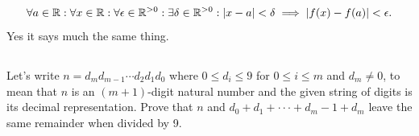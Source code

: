 \documentclass[12pt]{article}
\begin{document}
\subsection{}
\begin{mdframed}
  \begin{align*}
    \forall a \in \mathbb{R}: \forall x \in \mathbb{R}: \forall \epsilon \in \mathbb{R}^{>0}: \exists \delta \in \mathbb{R}^{>0}: |x - a| < \delta \implies |f(x) - f(a)| < \epsilon.
  \end{align*}
Yes it says much the same thing.
\end{mdframed}

\subsection{}

\newpage
\subsection{}
Let’s write $n = d_md_{m-1} \cdots d_2d_1d_0$ where $0 \leq d_i \leq 9$ for
$0 \leq i \leq m$ and $d_m \neq 0$, to mean that $n$ is an $(m+1)$-digit natural
number and the given string of digits is its decimal representation. Prove that
$n$ and $d_0 + d_1 + ··· + d_m−1 + d_m$ leave the same remainder
when divided by 9.\\
\end{document}
